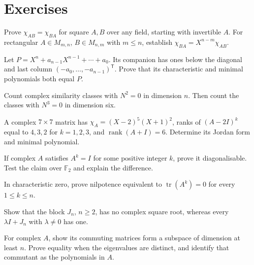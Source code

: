\section{Exercises}
\begin{exercise}[$\star$]\label{linear:ex:abba}
Prove $\chi_{AB}=\chi_{BA}$ for square $A,B$ over any field, starting with invertible $A$. For rectangular $A\in M_{m,n}$, $B\in M_{n,m}$ with $m\le n$, establish $\chi_{BA}=X^{n-m}\chi_{AB}$.
\end{exercise}
\begin{exercise}[$\star$]\label{linear:ex:companion}
Let $P=X^n+a_{n-1}X^{n-1}+\cdots+a_0$. Its companion has ones below the diagonal and last column $(-a_0,\ldots,-a_{n-1})^{\mathsf T}$. Prove that its characteristic and minimal polynomials both equal $P$.
\end{exercise}
\begin{exercise}[$\star$]\label{linear:ex:nilcount}
Count complex similarity classes with $N^2=0$ in dimension $n$. Then count the classes with $N^3=0$ in dimension six.
\end{exercise}
\begin{exercise}[$\star\star$]\label{linear:ex:jordanfind}
A complex $7\times7$ matrix has $\chi_A=(X-2)^5(X+1)^2$, ranks of $(A-2I)^k$ equal to $4,3,2$ for $k=1,2,3$, and $\operatorname{rank}(A+I)=6$. Determine its Jordan form and minimal polynomial.
\end{exercise}
\begin{exercise}[$\star\star$]\label{linear:ex:finiteorder}
If complex $A$ satisfies $A^k=I$ for some positive integer $k$, prove it diagonalisable. Test the claim over $\mathbb F_2$ and explain the difference.
\end{exercise}
\begin{exercise}[$\star\star$]\label{linear:ex:nilptrace}
In characteristic zero, prove nilpotence equivalent to $\operatorname{tr}(A^k)=0$ for every $1\le k\le n$.
\end{exercise}
\begin{exercise}[$\star\star$]\label{linear:ex:sqrt}
Show that the block $J_n$, $n\ge2$, has no complex square root, whereas every $\lambda I+J_n$ with $\lambda\ne0$ has one.
\end{exercise}
\begin{exercise}[$\star\star$]\label{linear:ex:commutant}
For complex $A$, show its commuting matrices form a subspace of dimension at least $n$. Prove equality when the eigenvalues are distinct, and identify that commutant as the polynomials in $A$.
\end{exercise}
